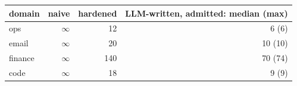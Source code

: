 \begin{tabular}{lrrr}
\toprule
domain & naive & hardened & LLM-written, admitted: median (max)\\
\midrule
ops & $\infty$ & 12 & 6 (6) \\
email & $\infty$ & 20 & 10 (10) \\
finance & $\infty$ & 140 & 70 (74) \\
code & $\infty$ & 18 & 9 (9) \\
\bottomrule
\end{tabular}
